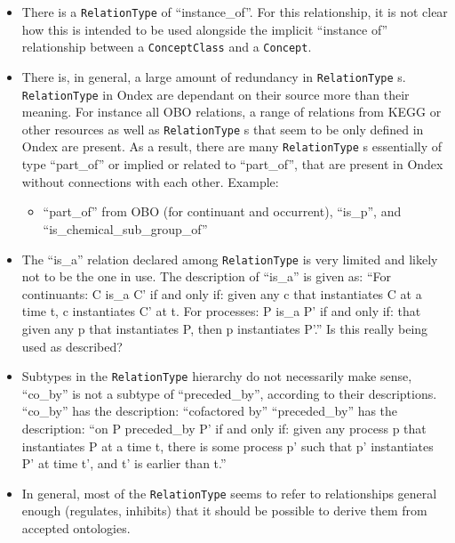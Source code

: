 \documentclass[a4paper,10pt]{article}
\newcommand{\term}[1]{\texttt{#1}\xspace}
\newcommand{\rt}{\term{RelationType}}
\begin{document}
\begin{itemize}
\item There is a \rt of ``instance\_of''. For this relationship, it is not clear how this is intended to be used alongside the implicit ``instance of'' relationship between a \term{ConceptClass} and a \term{Concept}.

\item There is, in general, a large amount of redundancy in \rt s. \rt in Ondex are dependant on their source more than their meaning. For instance all OBO relations, a range of relations from KEGG or other resources as well as \rt s that seem to be only defined in Ondex are present. As a result, there are many \rt s essentially of type ``part\_of'' or implied or related to ``part\_of'', that are present in Ondex without connections with each other. 
\newline
Example:
	\begin{itemize}
		\item ``part\_of'' from OBO (for continuant and occurrent), ``is\_p'', and ``is\_chemical\_sub\_group\_of''
	\end{itemize}

\item The ``is\_a'' relation declared among \rt is very limited and likely not to be the one in use. The description of ``is\_a'' is given as:
\vskip 0.5cm
\noindent
					``For continuants: C is\_a C' if and only if: given any
					c that instantiates C at a time t, c instantiates C'
					at t. For processes: P is\_a P' if and only if: that
					given any p that instantiates P, then p instantiates
					P'.''
\vskip 0.5cm
\noindent
Is this really being used as described?					

\item Subtypes in the \rt hierarchy do not necessarily make sense, ``co\_by'' is not a subtype of ``preceded\_by'', according to their descriptions.
\vskip 0.5cm
\noindent
``co\_by'' has the description:
\newline
``cofactored by''
\vskip 0.5cm
\noindent
``preceded\_by'' has the description:
\newline
					``on P preceded\_by P' if and only if: given any
					process p that instantiates P at a time t, there is
					some process p' such that p' instantiates P' at time
					t', and t' is earlier than t.''










\item In general, most of the \rt seems to refer to relationships general enough (regulates, inhibits) that it should be possible to derive them from accepted ontologies.


\end{itemize}
\end{document}
